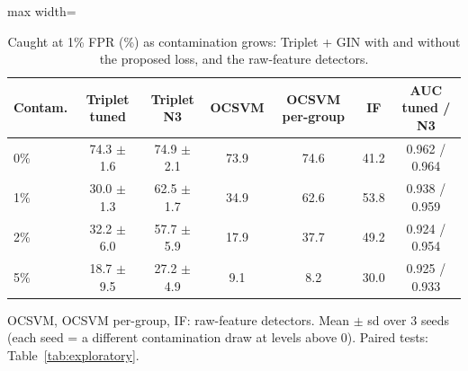 \begin{table}[htbp]
\centering
\footnotesize
\caption{Caught at 1\% FPR (\%) as contamination grows: Triplet + GIN with and without the proposed loss, and the raw-feature detectors.}
\label{tab:contamination}
\begin{adjustbox}{max width=\linewidth}
\begin{tabular}{lcccccc}
\toprule
Contam. & Triplet tuned & Triplet N3 & OCSVM & OCSVM per-group & IF & AUC tuned / N3 \\
\midrule
0\% & 74.3 $\pm$ 1.6 & 74.9 $\pm$ 2.1 & 73.9 & 74.6 & 41.2 & 0.962 / 0.964 \\
1\% & 30.0 $\pm$ 1.3 & 62.5 $\pm$ 1.7 & 34.9 & 62.6 & 53.8 & 0.938 / 0.959 \\
2\% & 32.2 $\pm$ 6.0 & 57.7 $\pm$ 5.9 & 17.9 & 37.7 & 49.2 & 0.924 / 0.954 \\
5\% & 18.7 $\pm$ 9.5 & 27.2 $\pm$ 4.9 & 9.1 & 8.2 & 30.0 & 0.925 / 0.933 \\
\bottomrule
\end{tabular}
\end{adjustbox}
\par\smallskip
\parbox{0.95\linewidth}{\footnotesize OCSVM, OCSVM per-group, IF: raw-feature detectors. Mean $\pm$ sd over 3 seeds (each seed = a different contamination draw at levels above 0). Paired tests: Table~\ref{tab:exploratory}.}
\end{table}
